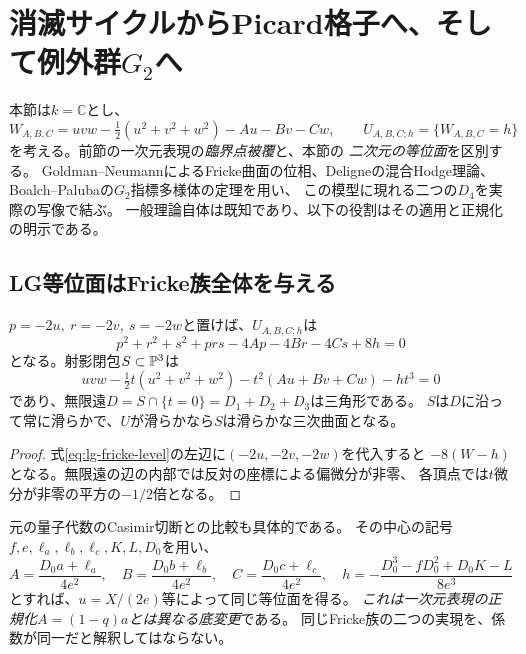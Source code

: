 \section{消滅サイクルからPicard格子へ、そして例外群\texorpdfstring{$G_2$}{G2}へ}
\label{sec:lg-picard-g2}
本節は$k=\mathbb C$とし、
\[
 W_{A,B,C}=uvw-\tfrac12(u^2+v^2+w^2)-Au-Bv-Cw,\qquad
 U_{A,B,C;h}=\{W_{A,B,C}=h\}
\]
を考える。前節の一次元表現の\emph{臨界点被覆}と、本節の
\emph{二次元の等位面}を区別する。
Goldman--NeumannによるFricke曲面の位相、Deligneの混合Hodge理論、
Boalch--Palubaの$G_2$指標多様体の定理を用い、
この模型に現れる二つの$D_4$を実際の写像で結ぶ。
一般理論自体は既知であり、以下の役割はその適用と正規化の明示である。

\subsection{LG等位面はFricke族全体を与える}
\begin{proposition}[正規化と三角境界]
\label{prop:lg-fricke-compactification}
$p=-2u,\ r=-2v,\ s=-2w$と置けば、$U_{A,B,C;h}$は
\begin{equation}\label{eq:lg-fricke-level}
 p^2+r^2+s^2+prs-4Ap-4Br-4Cs+8h=0
\end{equation}
となる。射影閉包$S\subset\mathbb P^3$は
\[
 uvw-\tfrac12t(u^2+v^2+w^2)-t^2(Au+Bv+Cw)-ht^3=0
\]
であり、無限遠$D=S\cap\{t=0\}=D_1+D_2+D_3$は三角形である。
$S$は$D$に沿って常に滑らかで、$U$が滑らかなら$S$は滑らかな三次曲面となる。
\end{proposition}
\begin{proof}
式\eqref{eq:lg-fricke-level}の左辺に$(-2u,-2v,-2w)$を代入すると
$-8(W-h)$となる。無限遠の辺の内部では反対の座標による偏微分が非零、
各頂点では$t$微分が非零の平方の$-1/2$倍となる。
\end{proof}

元の量子代数のCasimir切断との比較も具体的である。
その中心の記号$f,e,\ell_a,\ell_b,\ell_c,K,L,D_0$を用い、
\[
 A=\frac{D_0a+\ell_a}{4e^2},\quad
 B=\frac{D_0b+\ell_b}{4e^2},\quad
 C=\frac{D_0c+\ell_c}{4e^2},\quad
 h=-\frac{D_0^3-fD_0^2+D_0K-L}{8e^3}
\]
とすれば、$u=X/(2e)$等によって同じ等位面を得る。
\emph{これは一次元表現の正規化$A=(1-q)a$とは異なる底変更}である。
同じFricke族の二つの実現を、係数が同一だと解釈してはならない。

